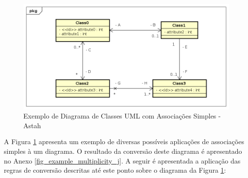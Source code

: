 \begin{figure}
    \begin{center}
        \includegraphics[scale=0.7]{imagens/Example_Multiplicity.png}
    \end{center}
	\caption{\label{fig_example_multiplicity}Exemplo de Diagrama de Classes UML com Associações Simples - Astah}
\end{figure}

A Figura \ref{fig_example_multiplicity} apresenta um exemplo de diversas possíveis aplicações de associações simples à um diagrama. O resultado da conversão deste diagrama é apresentado no Anexo \ref{fig_example_multiplicity_j}. A seguir é apresentada a aplicação das regras de conversão descritas até este ponto sobre o diagrama da Figura \ref{fig_example_multiplicity}:

